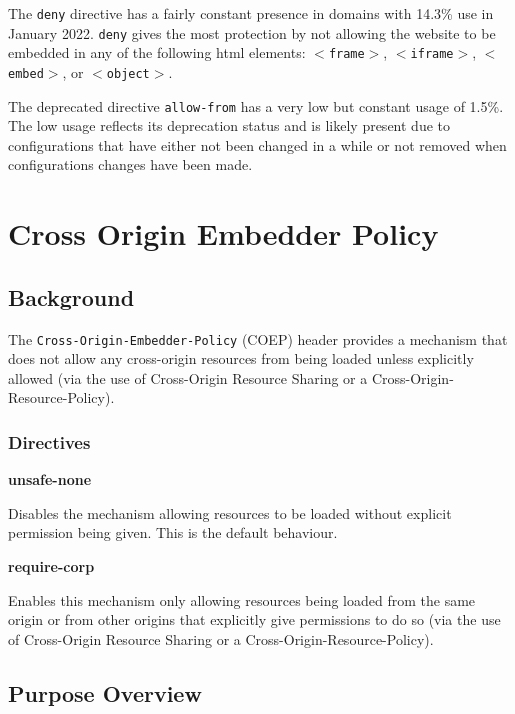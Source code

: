 \documentclass{mscreport}
\begin{document}
\vspace{0.3cm} \noindent
The \texttt{deny} directive has a fairly constant presence in domains with 14.3\% use in January 2022. \texttt{deny} gives the most protection by not allowing the website to be embedded in any of the following html elements: \texttt{$<$frame$>$}, \texttt{$<$iframe$>$}, \texttt{$<$embed$>$}, or \texttt{$<$object$>$}.

\vspace{0.3cm} \noindent
The deprecated directive \texttt{allow-from} has a very low but constant usage of 1.5\%. The low usage reflects its deprecation status and is likely present due to configurations that have either not been changed in a while or not removed when configurations changes have been made.

\clearpage
\newpage


\section{Cross Origin Embedder Policy}
\label{section:coep}

\subsection{Background}

The \texttt{Cross-Origin-Embedder-Policy} (COEP) header provides a mechanism that does not allow any cross-origin resources from being loaded unless explicitly allowed (via the use of Cross-Origin Resource Sharing or a Cross-Origin-Resource-Policy).

\subsubsection{Directives}
\textbf{unsafe-none}

\vspace{0.3cm} \noindent
Disables the mechanism allowing resources to be loaded without explicit permission being given. This is the default behaviour.

\vspace{0.7cm} \noindent
\textbf{require-corp}

\vspace{0.3cm} \noindent
Enables this mechanism only allowing resources being loaded from the same origin or from other origins that explicitly give permissions to do so (via the use of Cross-Origin Resource Sharing or a Cross-Origin-Resource-Policy).

\subsection{Purpose Overview}
\end{document}
